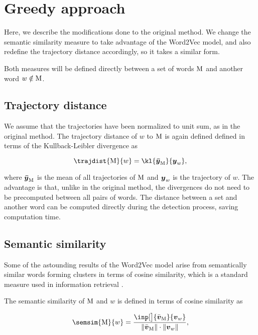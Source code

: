 \section{Greedy approach}
Here, we describe the modifications done to the original method. We change the semantic similarity measure to take advantage of the Word2Vec model, and also redefine the trajectory distance accordingly, so it takes a similar form.

Both measures will be defined directly between a set of words $\text{M}$ and another word $w \notin \text{M}$.

\subsection{Trajectory distance}
We assume that the trajectories have been normalized to unit sum, as in the original method. The trajectory distance of $w$ to $\text{M}$ is again defined defined in terms of the Kullback-Leibler divergence as

\begin{equation}
	\trajdist{\featset}{w} = \kl{\vect{\bar{\traj}}_{\featset}}{\vect{\traj}_{w}},
\end{equation}

where $\vect{\bar{\traj}}_{\featset}$ is the mean of all trajectories of $\text{M}$ and $\vect{\traj}_{w}$ is the trajectory of $w$. The advantage is that, unlike in the original method, the divergences do not need to be precomputed between all pairs of words. The distance between a set and another word can be computed directly during the detection process, saving computation time.


\subsection{Semantic similarity}
Some of the astounding results of the Word2Vec model arise from semantically similar words forming clusters \citep{linguistic-regularities} in terms of cosine similarity, which is a standard measure used in information retrieval \citep{information-retrieval, cosine-similarity}.

The semantic similarity of $\text{M}$ and $w$ is defined in terms of cosine similarity as

\begin{equation}
	\semsim{\featset}{w} = \frac{\inp[\big]{\bar{\embed}_{\featset}}{\embed_{w}}}{\| \bar{\embed}_{\featset} \| \cdot \| \embed_{w} \|},
\end{equation}

